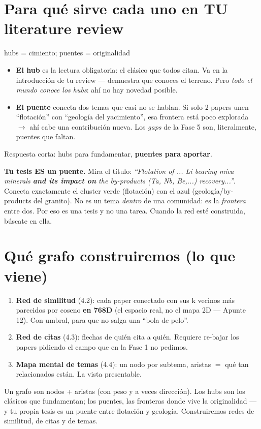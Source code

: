\documentclass[11pt,a4paper]{article}
\begin{document}
\section{Para qué sirve cada uno en TU literature review}

\begin{concepto}{hubs = cimiento; puentes = originalidad}
\begin{itemize}
  \item \textbf{El hub} es la lectura obligatoria: el clásico que todos citan. Va en la
        introducción de tu review — demuestra que conoces el terreno. Pero \emph{todo el
        mundo conoce los hubs}: ahí no hay novedad posible.
  \item \textbf{El puente} conecta dos temas que casi no se hablan. Si solo 2 papers unen
        ``flotación'' con ``geología del yacimiento'', esa frontera está poco explorada
        $\rightarrow$ ahí cabe una contribución nueva. Los \emph{gaps} de la Fase 5 son,
        literalmente, puentes que faltan.
\end{itemize}
Respuesta corta: hubs para fundamentar, \textbf{puentes para aportar}.
\end{concepto}

\begin{ojo}
\textbf{Tu tesis ES un puente.} Mira el título: \emph{``Flotation of ... Li bearing mica
minerals \textbf{and its impact on} the by-products (Ta, Nb, Be,...) recovery...''}. Conecta
exactamente el cluster verde (flotación) con el azul (geología/by-products del granito).
No es un tema \emph{dentro} de una comunidad: es la \emph{frontera} entre dos. Por eso es
una tesis y no una tarea. Cuando la red esté construida, búscate en ella.
\end{ojo}

\section{Qué grafo construiremos (lo que viene)}

\begin{enumerate}
  \item \textbf{Red de similitud} (4.2): cada paper conectado con sus k vecinos más parecidos
        por coseno \textbf{en 768D} (el espacio real, no el mapa 2D — Apunte 12). Con umbral,
        para que no salga una ``bola de pelo''.
  \item \textbf{Red de citas} (4.3): flechas de quién cita a quién. Requiere re-bajar los
        papers pidiendo el campo  que en la Fase 1 no pedimos.
  \item \textbf{Mapa mental de temas} (4.4): un nodo por subtema, aristas $=$ qué tan
        relacionados están. La vista presentable.
\end{enumerate}

\begin{resumen}
Un grafo son nodos + aristas (con peso y a veces dirección). Los hubs son los clásicos que
fundamentan; los puentes, las fronteras donde vive la originalidad — y tu propia tesis es un
puente entre flotación y geología. Construiremos redes de similitud, de citas y de temas.
\end{resumen}
\end{document}
